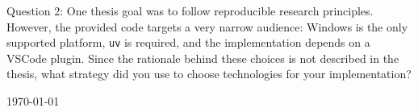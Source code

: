 \documentclass[12pt,a4paper]{article}
\begin{document}
\vspace{0.5cm}

Question 2: One thesis goal was to follow reproducible research principles.
However, the provided code targets a very narrow audience: Windows is the only supported platform, \texttt{uv} is required, and the implementation depends on a VSCode plugin. Since the rationale behind these choices is not described in the thesis, what strategy did you use to choose technologies for your implementation?

\vspace{0.5cm}
\textbf{\ReviewDate} \today 

\vspace{0.3cm}
\textbf{\ReviewSignature}
\end{document}
